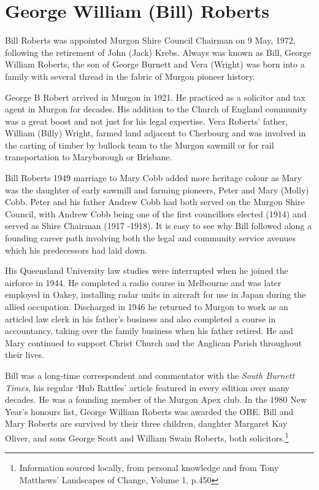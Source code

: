 \hypertarget{george-william-bill-roberts}{%
\section{George William (Bill) Roberts}\label{george-william-bill-roberts}}

Bill Roberts was appointed Murgon Shire Council Chairman on 9 May, 1972, following the retirement of John (Jack) Krebs. Always was known as Bill, George William Roberts, the son of George Burnett and Vera (Wright) was born into a family with several thread in the fabric of Murgon pioneer history.

George B Robert arrived in Murgon in 1921. He practiced as a solicitor and tax agent in Murgon for decades. His addition to the Church of England community was a great boost and not just for his legal expertise. Vera Roberts' father, William (Billy) Wright, farmed land adjacent to Cherbourg and was involved in the carting of timber by bullock team to the Murgon sawmill or for rail transportation to Maryborough or Brisbane.

Bill Roberts 1949 marriage to Mary Cobb added more heritage colour as Mary was the daughter of early sawmill and farming pioneers, Peter and Mary (Molly) Cobb. Peter and his father Andrew Cobb had both served on the Murgon Shire Council, with Andrew Cobb being one of the first councillors elected (1914) and served as Shire Chairman (1917 -1918). It is easy to see why Bill followed along a founding career path involving both the legal and community service avenues which his predecessors had laid down.

His Queensland University law studies were interrupted when he joined the airforce in 1944. He completed a radio course in Melbourne and was later employed in Oakey, installing radar units in aircraft for use in Japan during the allied occupation. Discharged in 1946 he returned to Murgon to work as an articled law clerk in his father's business and also completed a course in accountancy, taking over the family business when his father retired. He and Mary continued to support Christ Church and the Anglican Parish throughout their lives.

Bill was a long-time correspondent and commentator with the \emph{South Burnett Times}, his regular `Hub Rattles' article featured in every edition over many decades. He was a founding member of the Murgon Apex club. In the 1980 New Year's honours list, George William Roberts was awarded the OBE. Bill and Mary Roberts are survived by their three children, daughter Margaret Kay Oliver, and sons George Scott and William Swain Roberts, both solicitors.\footnote{Information sourced locally, from personal knowledge and from Tony Matthews' Landscapes of Change, Volume 1, p.450}

